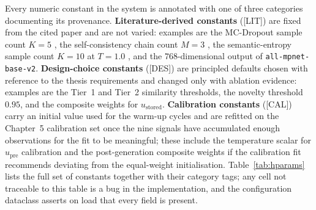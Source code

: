 Every numeric constant in the system is annotated with one of three categories documenting its provenance. \textbf{Literature-derived constants} ([LIT]) are fixed from the cited paper and are not varied: examples are the MC-Dropout sample count $K = 5$ \citep{pmlr-v48-gal16}, the self-consistency chain count $M = 3$ \citep{wang2023selfconsistency}, the semantic-entropy sample count $K = 10$ at $T = 1.0$ \citep{farquhar2024semantic}, and the $768$-dimensional output of \texttt{all-mpnet-base-v2}. \textbf{Design-choice constants} ([DES]) are principled defaults chosen with reference to the thesis requirements and changed only with ablation evidence: examples are the Tier~1 and Tier~2 similarity thresholds, the novelty threshold $0.95$, and the composite weights for $u_{\text{stored}}$. \textbf{Calibration constants} ([CAL]) carry an initial value used for the warm-up cycles and are refitted on the Chapter~5 calibration set once the nine signals have accumulated enough observations for the fit to be meaningful; these include the temperature scalar for $u_{\text{pre}}$ calibration \citep{pmlr-v70-guo17a} and the post-generation composite weights if the calibration fit recommends deviating from the equal-weight initialisation. Table~\ref{tab:hparams} lists the full set of constants together with their category tags; any cell not traceable to this table is a bug in the implementation, and the configuration dataclass asserts on load that every field is present.

